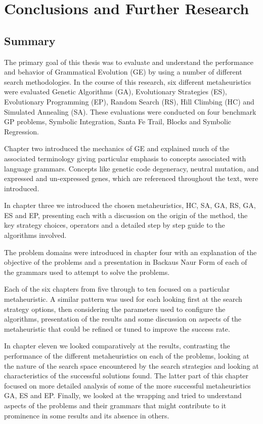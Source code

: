 \chapter{Conclusions and Further Research}
\section{Summary}
The primary goal of this thesis was to evaluate and understand the performance and behavior of Grammatical Evolution (GE) by using a number of different search methodologies. In the course of this research, six different metaheuristics were evaluated Genetic Algorithms (GA), Evolutionary Strategies (ES), Evolutionary Programming (EP), Random Search (RS), Hill Climbing (HC) and Simulated Annealing (SA). These evaluations were conducted on four benchmark GP problems, Symbolic Integration, Santa Fe Trail, Blocks and  Symbolic Regression.

Chapter two introduced the mechanics of GE and explained much of the associated terminology giving particular emphasis to concepts associated with language grammars. Concepts like  genetic code degeneracy, neutral mutation, and expressed and un-expressed genes, which are referenced throughout the text, were introduced. 

In chapter three we introduced the chosen metaheuristics, HC, SA, GA, RS, GA, ES and EP, presenting each with a discussion on the origin of the method, the key strategy choices, operators and a detailed step by step guide to the algorithms involved. 

The problem domains were introduced in chapter four with an explanation of the objective of the problems and a presentation in Backaus Naur Form of each of the grammars used to attempt to solve the problems.

Each of the six chapters from five through to ten focused on a particular metaheuristic. A similar pattern was used for each looking first at the search strategy options, then considering the parameters used to configure the algorithms, presentation of the results and some discussion on aspects of the metaheuristic that could be refined or tuned to improve the success rate.


In chapter eleven we looked comparatively at the results, contrasting the performance of the different metaheuristics on each of the problems, looking at the nature of the search space encountered by the search strategies and looking at characteristics of the successful solutions found. The latter part of this chapter focused on more detailed analysis of some of the more successful metaheuristics GA, ES and EP. Finally, we looked at the wrapping and tried to understand aspects of the problems and their grammars that might contribute to it prominence in some results  and its absence in others.


